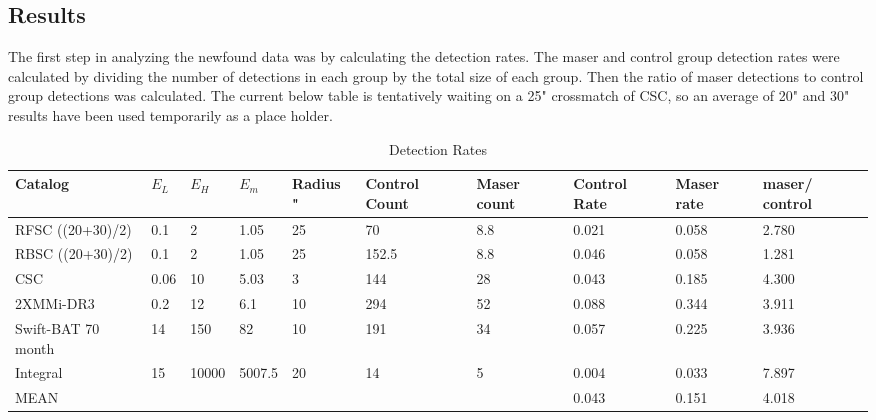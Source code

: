 \documentclass[10pt]{article}
\begin{document}
\begin{multicols}{2}
\section{Results}\label{results}
The first step in analyzing the newfound data was by calculating the detection rates. The maser and control group detection rates were calculated by dividing the number of detections in each group by the total size of each group. Then the ratio of maser detections to control group detections was calculated. The current below table is tentatively waiting on a 25" crossmatch of CSC, so an average of 20" and 30" results have been used temporarily as a place holder.

\end{multicols}
\begin {table}[h]
\caption {Detection Rates} \label{asdasd}
\begin{center}
{\footnotesize \begin{tabular} {|p{3cm}|p{1.2cm}|p{1.2cm}|p{0.8cm}|p{1.2cm}|p{1cm}|p{1cm}|p{1cm}|p{1cm}|p{1.2cm}|}
  \hline
Catalog & $E_L$ & $E_H$ & $E_m$ & Radius " & Control Count & Maser count & Control Rate & Maser rate & maser/ control \\
 \hline 
 \hline
RFSC ((20+30)/2) & 0.1 & 2 & 1.05 & 25 & 70 & 8.8 & 0.021 & 0.058 & 2.780 \\ \hline
RBSC ((20+30)/2) & 0.1 & 2 & 1.05 & 25 & 152.5 & 8.8 & 0.046 & 0.058 & 1.281 \\ \hline
CSC & 0.06 & 10 & 5.03 & 3 & 144 & 28 & 0.043 & 0.185 & 4.300 \\ \hline
2XMMi-DR3 & 0.2 & 12 & 6.1 & 10 & 294 & 52 & 0.088 & 0.344 & 3.911 \\ \hline
Swift-BAT 70 month & 14 & 150 & 82 & 10 & 191 & 34 & 0.057 & 0.225 & 3.936 \\ \hline
Integral & 15 & 10000 & 5007.5 & 20 & 14 & 5 & 0.004 & 0.033 & 7.897 \\ \hline
MEAN & & & & & & & 0.043 & 0.151 & 4.018 \\
  \hline
\end{tabular}}
\end{center}
\end {table}
\end{document}

